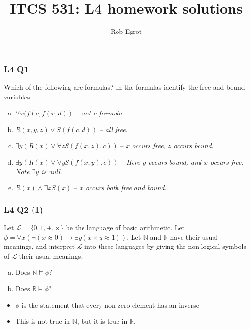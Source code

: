 \documentclass[handout]{beamer}
\title{ITCS 531: L4 homework solutions}
\date{}
\author{Rob Egrot}
\newcommand{\bN}{\mathbb{N}}
\newcommand{\bR}{\mathbb{R}}
\newcommand{\sL}{\mathscr{L}}
\begin{document}
\begin{frame}
\titlepage
\end{frame}

\begin{frame}
\frametitle{L4 Q1}
Which of the following are formulas? In the formulas identify the free and bound variables.  
\vspace{0.5cm}
\begin{enumerate}[a)]
\item $\forall x (f(c,f(x,d))$ -- \emph{not a formula}.
\vspace{0.3cm}
\item $R(x,y,z)\vee S(f(c,d))$ -- \emph{all free}.
\vspace{0.3cm}
\item $\exists y (R(x) \vee \forall z S(f(x,z),c))$ -- \emph{$x$ occurs free, $z$ occurs bound}.
\vspace{0.3cm}
\item $\exists y (R(x) \vee \forall y S(f(x,y),c))$ -- \emph{Here $y$ occurs bound, and $x$ occurs free. Note $\exists y$ is null}.
\vspace{0.3cm}
\item $R(x) \wedge \exists x S(x)$ -- \emph{$x$ occurs both free and bound.}.
\end{enumerate}
\end{frame}

\begin{frame}
\frametitle{L4 Q2 (1)}
Let $\sL=\{0,1,+,\times\}$ be the language of basic arithmetic. Let $\phi=\forall x(\neg(x\approx 0)\rightarrow \exists y(x\times y \approx 1))$. Let $\bN$ and $\bR$ have their usual meanings, and interpret $\sL$ into these languages by giving the non-logical symbols of $\sL$ their usual meanings. \vspace{0.4cm}
\begin{enumerate}[a)]
\item Does $\bN\models \phi$?
\item Does $\bR\models \phi$?
\end{enumerate} 
\vspace{0.5cm}
\begin{itemize}
\item $\phi$ is the statement that every non-zero element has an inverse.\vspace{0.2cm}
\item This is not true in $\bN$, but it is true in $\bR$. 
\end{itemize}
\end{frame}
\end{document}
